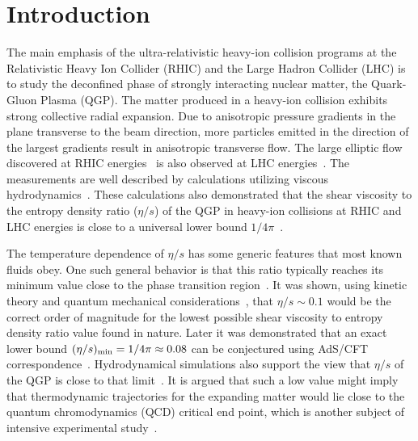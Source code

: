 
\section{Introduction}


The main emphasis of the ultra-relativistic heavy-ion collision programs at the Relativistic Heavy Ion Collider (RHIC) and the Large Hadron Collider (LHC) is to study the deconfined phase of strongly interacting nuclear matter, the Quark-Gluon Plasma (QGP). 
The matter produced in a heavy-ion collision exhibits strong collective radial expansion. Due to anisotropic pressure gradients in the plane transverse to the beam direction, more particles emitted in the direction of the largest gradients result in anisotropic transverse flow.
The large elliptic flow discovered at RHIC energies~\cite{Ackermann:2000tr} is also observed at LHC energies~\cite{Aamodt:2010pa,Adam:2016izf}. The measurements are well described by calculations utilizing viscous hydrodynamics~\cite{Romatschke:2007mq,Shen:2011eg,Schenke:2011zz,Bozek:2012qs,Gale:2012rq,Hirano:2010je}.
These calculations also demonstrated that the shear viscosity to the entropy density ratio ($\eta/s$) of the QGP in heavy-ion collisions at RHIC and LHC energies is close to a universal lower bound $1/4\pi$~\cite{Kovtun:2004de}.

The temperature dependence of $\eta/s$ has some generic features that most known fluids obey. One such general behavior is that this ratio typically reaches its minimum value close to the phase transition region~\cite{Lacey:2006bc}. 
It was shown, using kinetic theory and quantum mechanical considerations~\cite{PhysRevD.31.53}, that $\eta/s\sim0.1$ would be the correct order of magnitude for the lowest possible shear viscosity to entropy density ratio value found in nature. Later it was demonstrated that an exact lower bound $(\eta/s)_{\rm min}=1/4\pi\approx0.08$ can be conjectured using AdS/CFT correspondence~\cite{Kovtun:2004de}. Hydrodynamical simulations also support the view that $\eta/s$ of the QGP is close to that limit~\cite{Gale:2012rq}.
It is argued that such a low value might imply that thermodynamic trajectories for the expanding matter would lie close to the quantum chromodynamics (QCD) critical end point, which is another subject of intensive experimental study~\cite{Lacey:2006bc,Csernai:2006zz}.

